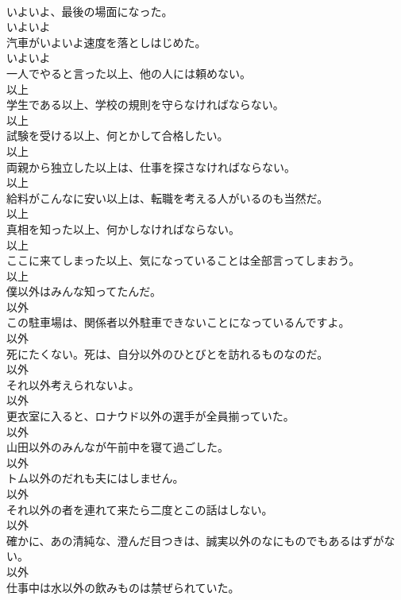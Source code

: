 \documentclass[8pt]{extreport}
\begin{document}
\begin{CJK}{UTF8}{min}
\\	いよいよ、最後の場面になった。	
\\	いよいよ
\\	汽車がいよいよ速度を落としはじめた。	
\\	いよいよ
\\	一人でやると言った以上、他の人には頼めない。	
\\	以上
\\	学生である以上、学校の規則を守らなければならない。	
\\	以上
\\	試験を受ける以上、何とかして合格したい。	
\\	以上
\\	両親から独立した以上は、仕事を探さなければならない。	
\\	以上
\\	給料がこんなに安い以上は、転職を考える人がいるのも当然だ。	
\\	以上
\\	真相を知った以上、何かしなければならない。	
\\	以上
\\	ここに来てしまった以上、気になっていることは全部言ってしまおう。	
\\	以上
\\	僕以外はみんな知ってたんだ。	
\\	以外
\\	この駐車場は、関係者以外駐車できないことになっているんですよ。	
\\	以外
\\	死にたくない。死は、自分以外のひとびとを訪れるものなのだ。	
\\	以外
\\	それ以外考えられないよ。	
\\	以外
\\	更衣室に入ると、ロナウド以外の選手が全員揃っていた。	
\\	以外
\\	山田以外のみんなが午前中を寝て過ごした。	
\\	以外
\\	トム以外のだれも夫にはしません。	
\\	以外
\\	それ以外の者を連れて来たら二度とこの話はしない。	
\\	以外
\\	確かに、あの清純な、澄んだ目つきは、誠実以外のなにものでもあるはずがない。	
\\	以外
\\	仕事中は水以外の飲みものは禁ぜられていた。	

\end{CJK}
\end{document}
